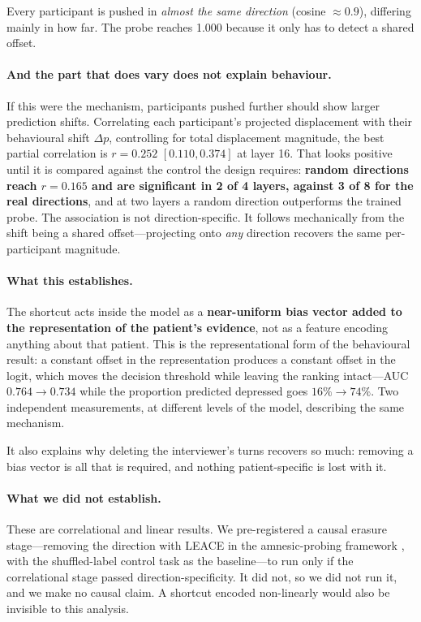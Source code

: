 \documentclass{article}
\begin{document}
Every participant is pushed in \emph{almost the same direction} (cosine $\approx
0.9$), differing mainly in how far. The probe reaches 1.000 because it only has
to detect a shared offset.

\paragraph{And the part that does vary does not explain behaviour.} If this were
the mechanism, participants pushed further should show larger prediction shifts.
Correlating each participant's projected displacement with their behavioural
shift $\Delta p$, controlling for total displacement magnitude, the best partial
correlation is $r = 0.252$ $[0.110, 0.374]$ at layer 16. That looks positive
until it is compared against the control the design requires: \textbf{random
directions reach $r = 0.165$ and are significant in 2 of 4 layers, against 3 of
8 for the real directions}, and at two layers a random direction outperforms the
trained probe. The association is not direction-specific. It follows mechanically
from the shift being a shared offset---projecting onto \emph{any} direction
recovers the same per-participant magnitude.

\paragraph{What this establishes.} The shortcut acts inside the model as a
\textbf{near-uniform bias vector added to the representation of the patient's
evidence}, not as a feature encoding anything about that patient. This is the
representational form of the behavioural result: a constant offset in the
representation produces a constant offset in the logit, which moves the decision
threshold while leaving the ranking intact---AUC $0.764 \to 0.734$ while the
proportion predicted depressed goes $16\% \to 74\%$. Two independent
measurements, at different levels of the model, describing the same mechanism.

It also explains why deleting the interviewer's turns recovers so much: removing
a bias vector is all that is required, and nothing patient-specific is lost with
it.

\paragraph{What we did not establish.} These are correlational and linear
results. We pre-registered a causal erasure stage---removing the direction with
LEACE \citep{belrose2023leace} in the amnesic-probing framework
\citep{elazar2021amnesic,dobrzeniecka2025improving}, with the shuffled-label
control task as the baseline---to run only if the correlational stage passed
direction-specificity. It did not, so we did not run it, and we make no causal
claim. A shortcut encoded non-linearly would also be invisible to this analysis.
\end{document}
